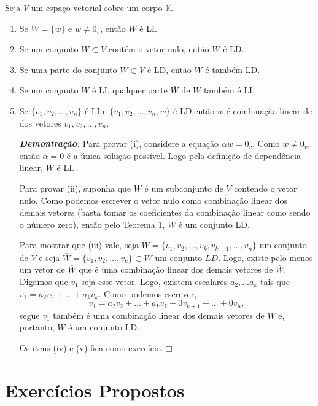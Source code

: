 Seja $V$ um espaço vetorial sobre um corpo $\mathbb{K}$.
\begin{enumerate}
\item Se  $W=\{w\}$ e $w \neq 0_v$, então $W$ é LI.
\item Se um conjunto $W \subset V$  contém o vetor nulo, então $W$ é LD.
\item 	Se uma parte do conjunto $W \subset V$  é LD, então $W$  é também LD.
\item 	Se um conjunto  $W$  é LI, qualquer parte $\bar{W}$ de $W$  também é  LI.
\item 	Se $\{v_1, v_2,..., v_n\}$  é LI e  $\{v_1, v_2,..., v_n, w\}$ é LD,então $w$ é combinação linear de  dos vetores  $v_1, v_2,..., v_n$.

\textbf{\textit{Demontração.}} Para provar (i), considere a equação $ \alpha w=0_v$. Como $w\neq 0_v$, então $\alpha=0$ é a única solução possível. Logo pela definição de dependência linear, $W$ é LI.

 Para provar (ii), suponha que  $W$ é um subconjunto de $V$ contendo o vetor nulo. Como podemos escrever o vetor nulo como combinação linear dos demais vetores (basta tomar os coeficientes da combinação linear como sendo o número zero), então pelo Teorema 1, $W$ é um conjunto LD.

Para mostrar que (iii) vale, seja $W=\{v_1, v_2,..., v_k, v_{k+1},...,v_n\}$ um conjunto de $V$ e seja $\bar{W}=\{v_1, v_2,..., v_k\} \subset W$ um conjunto  $LD$. Logo, existe pelo menos um vetor  de $\bar{W}$  que é uma combinação linear dos demais vetores de $\bar{W}$. Digamos que $v_1$ seja esse vetor. Logo,  existem escalares $a_2,...a_k$ tais que $v_1=a_2 v_2+...+ a_kv_k$. Como podemos escrever, $$v_1=a_2 v_2+...+ a_kv_k+0v_{k+1}+...+0v_n,$$
segue $v_1$ também é uma combinação linear dos demais  vetores de $W$ e, portanto, $W$ é um conjunto LD.



Os itens (iv) e (v) fica como exercício.$\Box$


\end{enumerate}


\section{Exercícios Propostos}


